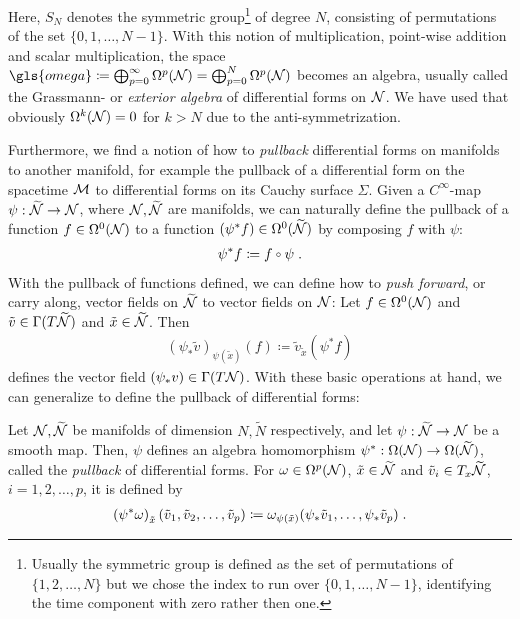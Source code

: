 Here, $S_N$ denotes the symmetric group\footnote{Usually the symmetric group is defined as the set of permutations of $\{1,2,\dots,N\}$ but we chose the index to run over $\{0,1,\dots,N-1\}$, identifying the time component with zero rather then one.} of degree $N$, consisting of permutations of the set $\{0,1,\dots,N-1\}$.
With this notion of multiplication, point-wise addition and scalar multiplication, the space $\gls{omega} \coloneqq \bigoplus_{p = 0}^\infty \Omega^p(\N) = \bigoplus_{p = 0}^N \Omega^p(\N)$ becomes an algebra, usually called the Grassmann- or \emph{exterior algebra} of differential forms on $\mathcal{N}$. We have used that obviously $\Omega^k(\mathcal{N}) =0$ for $k >N$ due to the anti-symmetrization.\par
Furthermore, we find a notion of how to \emph{pullback} differential forms on manifolds to another manifold, for example the pullback of a differential form on the spacetime $\mathcal{M}$ to differential forms on its Cauchy surface $\Sigma$. Given a $C^\infty$-map $\psi: \widetilde{\mathcal{N}} \to \mathcal{N}$, where $\mathcal{N}, \widetilde{\mathcal{N}}$ are manifolds, we can naturally define the pullback of a function $f \in \Omega^0(\mathcal{N})$ to a function $(\psi^* f) \in \Omega^0(\widetilde{\mathcal{N}})$ by composing $f$ with $\psi$:
\begin{align}
\psi^* f \coloneqq f \comp \psi \formspace.
\end{align}
\newpage
With the pullback of functions defined, we can define how to \emph{push forward}, or carry along, vector fields on $\widetilde{\mathcal{N}}$ to vector fields on $\mathcal{N}$: Let $f\in \Omega^0(\mathcal{N})$ and $\tilde{v} \in \Gamma(T\widetilde{\mathcal{N}})$ and $\tilde{x} \in \widetilde{\mathcal{N}}$. Then
\begin{align}
(\psi_* \tilde{v})_{\psi(\tilde{x})} (f) \coloneqq \tilde{v}_{\tilde{x}}(\psi^* f)
\end{align}
defines the vector field $(\psi_* v) \in \Gamma(T\mathcal{N})$. With these basic operations at hand, we can generalize to define the pullback of differential forms:
\begin{definition}[Pullback]\label{def:pullback}
	Let $\mathcal{N}, \widetilde{\mathcal{N}}$ be manifolds of dimension $N,\widetilde{N}$ respectively, and let $\psi: \widetilde{\mathcal{N}} \to \mathcal{N}$ be a smooth map. Then, $\psi$ defines an algebra homomorphism $\psi^* : \Omega(\mathcal{N}) \to  \Omega(\widetilde{\mathcal{N}})$,
	called the \emph{pullback} of differential forms. For $\omega \in \Omega^p(\mathcal{N})$, $\tilde{x} \in \widetilde{\mathcal{N}}$ and $\tilde{v}_i \in T_x \widetilde{\mathcal{N}}$, $i=1,2,\dots,p$, it is defined by
	\begin{align}
	\left( \psi^* \omega \right)_{\tilde{x}}  (\tilde{v}_1,\tilde{v}_2,\dots,\tilde{v}_p) \coloneqq \omega_{\psi(\tilde{x})} (\psi_* \tilde{v}_1, \dots , \psi_* \tilde{v}_p) \;.
	\end{align}
\end{definition}
